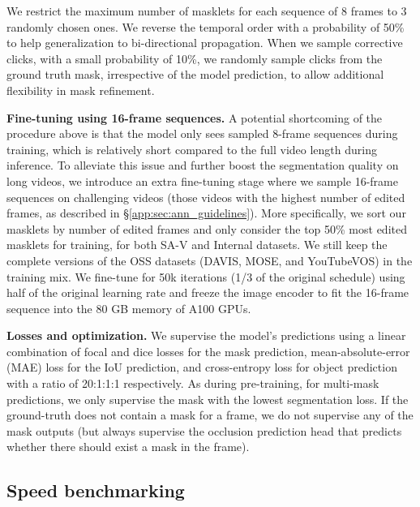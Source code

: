 \documentclass[]{fairmeta}
\renewcommand{\paragraph}[1]{\vspace{1.25mm}\noindent\textbf{#1}}
\newcommand{\secref}[1]{\S\ref{#1}}
\renewcommand{\paragraph}[1]{\vspace{1.25mm}\noindent\textbf{#1}}
\begin{document}
We restrict the maximum number of masklets for each sequence of 8 frames to 3 randomly chosen ones. We reverse the temporal order with a probability of 50\% to help generalization to bi-directional propagation. When we sample corrective clicks, with a small probability of 10\%, we randomly sample clicks from the ground truth mask, irrespective of the model prediction, to allow additional flexibility in mask refinement.

\paragraph{Fine-tuning using 16-frame sequences.} A potential shortcoming of the procedure above is that the model only sees sampled 8-frame sequences during training, which is relatively short compared to the full video length during inference. To alleviate this issue and further boost the segmentation quality on long videos, we introduce an extra fine-tuning stage where we sample 16-frame sequences on challenging videos (those videos with the highest number of edited frames, as described in \secref{app:sec:ann_guidelines}). More specifically, we sort our masklets by number of edited frames and only consider the top 50\% most edited masklets for training, for both SA-V and Internal datasets. We still keep the complete versions of the OSS datasets (DAVIS, MOSE, and YouTubeVOS) in the training mix. We fine-tune for 50k iterations (1/3 of the original schedule) using half of the original learning rate and freeze the image encoder to fit the 16-frame sequence into the 80 GB memory of A100 GPUs.

\paragraph{Losses and optimization.} We supervise the model's predictions using a linear combination of focal and dice losses for the mask prediction, mean-absolute-error (MAE) loss for the IoU prediction, and cross-entropy loss for object prediction with a ratio of 20:1:1:1 respectively. As during pre-training, for multi-mask predictions, we only supervise the mask with the lowest segmentation loss. If the ground-truth does not contain a mask for a frame, we do not supervise any of the mask outputs (but always supervise the occlusion prediction head that predicts whether there should exist a mask in the frame).



\subsection{Speed benchmarking}
\label{sec:speed_benchmarking}
\end{document}
